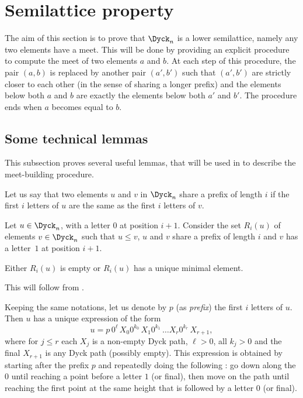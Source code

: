\section{Semilattice property}

\label{section-semilattice}

The aim of this section is to prove that $\Dyck_n$ is a lower
semilattice, namely any two elements have a meet. This will be done by
providing an explicit procedure to compute the meet of two elements
$a$ and $b$. At each step of this procedure, the pair $(a,b)$ is
replaced by another pair $(a',b')$ such that $(a',b')$ are strictly closer to
each other (in the sense of sharing a longer prefix) and the elements below both $a$ and $b$ are
exactly the elements below both $a'$ and $b'$. The procedure ends when $a$
becomes equal to $b$.

\subsection{Some technical lemmas}

This subsection proves several useful lemmas, that will be used in
 to describe the meet-building procedure.

Let us say that two elements $u$ and $v$ in $\Dyck_n$ share a prefix
of length $i$ if the first $i$ letters of $u$ are the same as the
first $i$ letters of $v$.

\begin{lemma}
  \label{forcer_un}
  Let $u \in \Dyck_n$, with a letter $0$ at position $i+1$. Consider
  the set $R_i(u)$ of elements $v \in \Dyck_n$ such that $u \leq v$,
  $u$ and $v$ share a prefix of length $i$ and $v$ has a letter~$1$ at
  position $i+1$.

  Either $R_i(u)$ is empty or $R_i(u)$ has a unique minimal element.
\end{lemma}
This will follow from .

Keeping the same notations, let us denote by $p$ (as \emph{prefix}) the first $i$ letters
of $u$. Then $u$ has a unique expression of the form
\begin{equation}
  \label{locked_pic}
  u = p \, 0^{\ell} \, X_0 0^{k_0} \, X_1 0^{k_1} \, \dots X_r 0^{k_r} \, X_{r+1},
\end{equation}
where for $j \leq r$ each $X_j$ is a non-empty Dyck path, $\ell > 0$,
all $k_j > 0$ and the final $X_{r+1}$ is any Dyck path (possibly
empty). This expression is obtained by starting after the prefix $p$ and
repeatedly doing the following : go down along the $0$ until reaching a
point before a letter $1$ (or final), then move on the path until reaching the
first point at the same height that is followed by a letter $0$ (or final).

